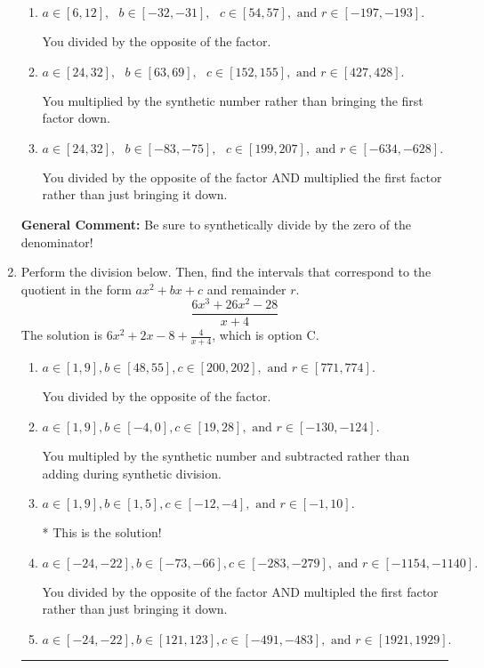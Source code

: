 \documentclass{extbook}[14pt]
\newcommand{\litem}[1]{\item #1

\rule{\textwidth}{0.4pt}}
\begin{document}
\begin{enumerate}
{\begin{enumerate}[label=\Alph*.]
 You multiplied by the synthetic number and subtracted rather than adding during synthetic division.
\item \( a \in [6, 12], \text{   } b \in [-32, -31], \text{   } c \in [54, 57], \text{   and   } r \in [-197, -193]. \)

 You divided by the opposite of the factor.
\item \( a \in [24, 32], \text{   } b \in [63, 69], \text{   } c \in [152, 155], \text{   and   } r \in [427, 428]. \)

 You multiplied by the synthetic number rather than bringing the first factor down.
\item \( a \in [24, 32], \text{   } b \in [-83, -75], \text{   } c \in [199, 207], \text{   and   } r \in [-634, -628]. \)

 You divided by the opposite of the factor AND multiplied the first factor rather than just bringing it down.
\end{enumerate}

\textbf{General Comment:} Be sure to synthetically divide by the zero of the denominator!
}
\litem{
Perform the division below. Then, find the intervals that correspond to the quotient in the form $ax^2+bx+c$ and remainder $r$.
\[ \frac{6x^{3} +26 x^{2} -28}{x + 4} \]The solution is \( 6x^{2} +2 x -8 + \frac{4}{x + 4} \), which is option C.\begin{enumerate}[label=\Alph*.]
\item \( a \in [1, 9], b \in [48, 55], c \in [200, 202], \text{ and } r \in [771, 774]. \)

 You divided by the opposite of the factor.
\item \( a \in [1, 9], b \in [-4, 0], c \in [19, 28], \text{ and } r \in [-130, -124]. \)

 You multipled by the synthetic number and subtracted rather than adding during synthetic division.
\item \( a \in [1, 9], b \in [1, 5], c \in [-12, -4], \text{ and } r \in [-1, 10]. \)

* This is the solution!
\item \( a \in [-24, -22], b \in [-73, -66], c \in [-283, -279], \text{ and } r \in [-1154, -1140]. \)

 You divided by the opposite of the factor AND multipled the first factor rather than just bringing it down.
\item \( a \in [-24, -22], b \in [121, 123], c \in [-491, -483], \text{ and } r \in [1921, 1929]. \)


\end{enumerate}}
\end{enumerate}
\end{document}
